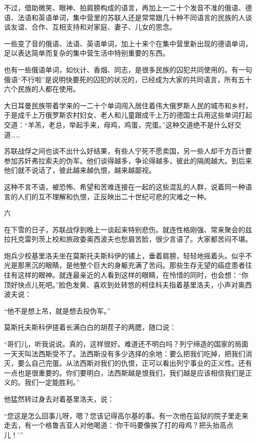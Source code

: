 不过，借助微笑、眼神、拍肩膀构成的语言，再加上一二十个发音不准的俄语、德语、法语和英语单词，集中营里的苏联人还是常常跟几十种不同语言的民族的人谈谈友谊、合作、互相支持和对家庭、妻子、儿女的思念。

一些变了音的俄语、法语、英语单词，加上十来个在集中营里新出现的德语单词，足以表达简单而复杂的集中营生活中特别重要的东西。

也有一些俄语单词，如伙计、香烟、同志，是很多民族的囚犯共同使用的。有一句俄语“不行啦”是说明快要死的囚犯的状况的，已经成为大家的共同语言，所有五十六个民族的人都在使用。

大日耳曼民族带着学来的一二十个单词闯入居住着伟大俄罗斯人民的城市和乡村，于是成千上万俄罗斯农村妇女、老人和儿童跟成千上万的德国士兵用这些单词打起交道：“羊羔，老总，举起手来，母鸡，鸡蛋，完蛋。”这种交道绝不是什么好交道……

苏联战俘之间也谈不出什么好结果，有些人宁死不愿卖国，另一些人却千方百计要参加苏奸弗拉索夫的伪军。他们谈得越多，争论得越多，彼此的隔阂越大。到后来他们就不说话了，彼此越来越仇恨，越来越鄙视。

这种不言不语，被恐怖、希望和苦难连接在一起的这些混乱的人群，说着同一种语言的人们的互不理解和仇恨，正反映出二十世纪可悲的灾难之一种。

六

在下雪的日子，苏联战俘到晚上一谈起来特别悲伤。就连性格刚强、常来聚会的兹拉托克雷列茨上校和旅政委奥西波夫也愁眉苦脸，很少言语了。大家都苦闷不堪。

炮兵少校基里洛夫坐在莫斯托夫斯科伊的铺上，垂着肩膀，轻轻地摇着头。似乎不光是那黑沉的眼睛，是他整个巨大的身躯充满了苦闷。那些生存无望的癌症患者往往有这样的眼神。就连最亲近的人看到这样的眼睛，在怜惜的同时，也会想：“你顶好快点儿死吧。”脸色发黄、喜欢到处转悠的柯佳科夫指着基里洛夫，小声对奥西波夫说：

“他不是想上吊，就是想去投伪军。”

莫斯托夫斯科伊搓着长满白白的胡茬子的两腮，随口说：

“哥们儿，听我说说。真的，这样很好。难道还不明白吗？列宁缔造的国家的局面一天天叫法西斯受不了。法西斯没有多少选择的余地：要么把我们吃掉，把我们消灭，要么自己完蛋。从法西斯对我们的仇恨，正可以看出列宁事业的正义性。还有一点也是很重要的。你们要明白，法西斯越是恨我们，我们越是应该相信我们是正义的。我们一定能胜利。”

他猛然转过身去对着基里洛夫，说：

“您这是怎么回事儿呀，嗯？您该记得高尔基的事。有一次他在监狱的院子里走来走去，有一个格鲁吉亚人对他喝道：‘你干吗要像挨了打的母鸡？把头抬高点儿！’”

